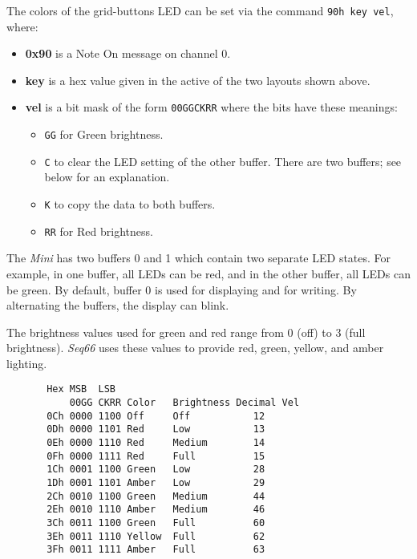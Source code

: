    The colors of the grid-buttons LED can be set via the command
   \texttt{90h key vel}, where:

   \begin{itemize}
      \item \textbf{0x90}
         is a Note On message on channel 0.
      \item \textbf{key} is a hex value given in the active of the
         two layouts shown above.
      \item \textbf{vel} is a bit mask of the form \texttt{00GGCKRR} where the
         bits have these meanings:
         \begin{itemize}
            \item \texttt{GG} for Green brightness.
            \item \texttt{C} to clear the LED setting of the other buffer.
               There are two buffers; see below for an explanation.
            \item \texttt{K} to copy the data to both buffers.
            \item \texttt{RR} for Red brightness.
         \end{itemize}
   \end{itemize}

   The \textsl{Mini} has
   two buffers 0 and 1 which contain two separate LED states. For
   example, in one buffer, all LEDs can be red, and in the other buffer, all LEDs
   can be green.  By default, buffer 0 is used for displaying and for writing.
   By alternating the buffers, the display can blink.

   The brightness values used for green and red range from 0 (off) to 3 (full
   brightness).  \textsl{Seq66} uses these values to provide red, green, yellow,
   and amber lighting.

   \begin{verbatim}
       Hex MSB  LSB
           00GG CKRR Color   Brightness Decimal Vel
       0Ch 0000 1100 Off     Off           12
       0Dh 0000 1101 Red     Low           13
       0Eh 0000 1110 Red     Medium        14
       0Fh 0000 1111 Red     Full          15
       1Ch 0001 1100 Green   Low           28
       1Dh 0001 1101 Amber   Low           29
       2Ch 0010 1100 Green   Medium        44
       2Eh 0010 1110 Amber   Medium        46
       3Ch 0011 1100 Green   Full          60
       3Eh 0011 1110 Yellow  Full          62
       3Fh 0011 1111 Amber   Full          63
   \end{verbatim}

